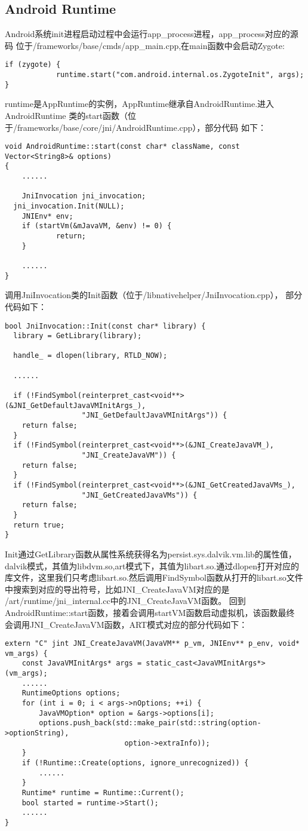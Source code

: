 \subsection{Android Runtime}
Android系统init进程启动过程中会运行app\_process进程，app\_process对应的源码
位于/frameworks/base/cmds/app\_main.cpp,在main函数中会启动Zygote:
\begin{lstlisting}
if (zygote) {
	        runtime.start("com.android.internal.os.ZygoteInit", args);
}
\end{lstlisting}
runtime是AppRuntime的实例，AppRuntime继承自AndroidRuntime.进入AndroidRuntime
类的start函数（位于/frameworks/base/core/jni/AndroidRuntime.cpp），部分代码
如下：
\begin{lstlisting}
void AndroidRuntime::start(const char* className, const Vector<String8>& options)
{
	......

	JniInvocation jni_invocation;					  
  jni_invocation.Init(NULL);
	JNIEnv* env;
    if (startVm(&mJavaVM, &env) != 0) {
     		return;
	}
       
	......
}
\end{lstlisting}	
调用JniInvocation类的Init函数（位于/libnativehelper/JniInvocation.cpp），
部分代码如下：
\begin{lstlisting}
bool JniInvocation::Init(const char* library) {
  library = GetLibrary(library);

  handle_ = dlopen(library, RTLD_NOW);
  
  ......

  if (!FindSymbol(reinterpret_cast<void**>(&JNI_GetDefaultJavaVMInitArgs_),
                  "JNI_GetDefaultJavaVMInitArgs")) {
    return false;
  }
  if (!FindSymbol(reinterpret_cast<void**>(&JNI_CreateJavaVM_),
                  "JNI_CreateJavaVM")) {
    return false;
  }
  if (!FindSymbol(reinterpret_cast<void**>(&JNI_GetCreatedJavaVMs_),
                  "JNI_GetCreatedJavaVMs")) {
    return false;
  }
  return true;
}
\end{lstlisting}
Init通过GetLibrary函数从属性系统获得名为persist.sys.dalvik.vm.lib的属性值，
dalvik模式，其值为libdvm.so,art模式下，其值为libart.so.通过dlopen打开对应的
库文件，这里我们只考虑libart.so.然后调用FindSymbol函数从打开的libart.so文件
中搜索到对应的导出符号，比如JNI\_CreateJavaVM对应的是
/art/runtime/jni\_internal.cc中的JNI\_CreateJavaVM函数。
回到AndroidRuntime::start函数，接着会调用startVM函数启动虚拟机，该函数最终
会调用JNI\_CreateJavaVM函数，ART模式对应的部分代码如下：
\begin{lstlisting}
extern "C" jint JNI_CreateJavaVM(JavaVM** p_vm, JNIEnv** p_env, void* vm_args) {
	const JavaVMInitArgs* args = static_cast<JavaVMInitArgs*>(vm_args);
	......
	RuntimeOptions options;
    for (int i = 0; i < args->nOptions; ++i) {
		JavaVMOption* option = &args->options[i];
	   	options.push_back(std::make_pair(std::string(option->optionString),
					    	option->extraInfo));
  	}
	if (!Runtime::Create(options, ignore_unrecognized)) {
		......
	}
	Runtime* runtime = Runtime::Current();
	bool started = runtime->Start();
	......
}
\end{lstlisting}
